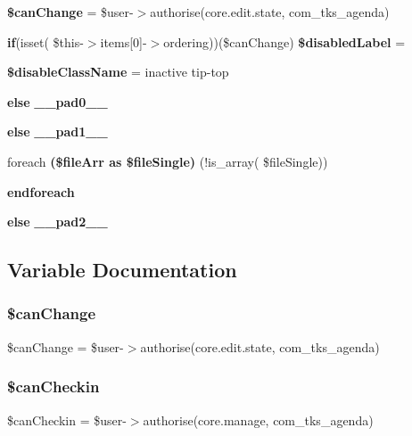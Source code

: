 \begin{DoxyCompactItemize}
\item 
\textbf{ \$can\+Change} = \$user-\/$>$authorise(\textquotesingle{}core.\+edit.\+state\textquotesingle{}, \textquotesingle{}com\+\_\+tks\+\_\+agenda\textquotesingle{})
\item 
\textbf{ if}(isset( \$this-\/$>$items[0]-\/$>$ordering))(\$can\+Change) \textbf{ \$disabled\+Label} = \textquotesingle{}\textquotesingle{}
\item 
\textbf{ \$disable\+Class\+Name} = \textquotesingle{}inactive tip-\/top\textquotesingle{}
\item 
\textbf{ else} \textbf{ \+\_\+\+\_\+pad0\+\_\+\+\_\+}
\item 
\textbf{ else} \textbf{ \+\_\+\+\_\+pad1\+\_\+\+\_\+}
\item 
foreach \textbf{ (\$file\+Arr as \$file\+Single)} (!is\+\_\+array( \$file\+Single))
\item 
\textbf{ endforeach}
\item 
\textbf{ else} \textbf{ \+\_\+\+\_\+pad2\+\_\+\+\_\+}
\end{DoxyCompactItemize}


\subsection{Variable Documentation}
\mbox{\label{administrator_2views_2downloads_2tmpl_2default_8php_a5baed5c5102e35aea5e62f18b474dc3f}} 
\subsubsection{\$can\+Change}
{\footnotesize\ttfamily \$can\+Change = \$user-\/$>$authorise(\textquotesingle{}core.\+edit.\+state\textquotesingle{}, \textquotesingle{}com\+\_\+tks\+\_\+agenda\textquotesingle{})}

\mbox{\label{administrator_2views_2downloads_2tmpl_2default_8php_ad261c913946b4e234d7ed6a972e27823}} 
\subsubsection{\$can\+Checkin}
{\footnotesize\ttfamily \$can\+Checkin = \$user-\/$>$authorise(\textquotesingle{}core.\+manage\textquotesingle{}, \textquotesingle{}com\+\_\+tks\+\_\+agenda\textquotesingle{})}

